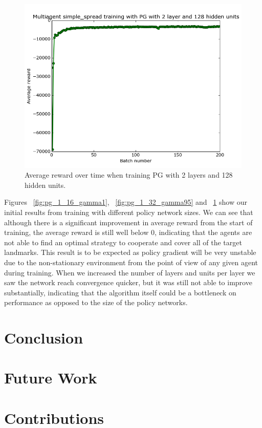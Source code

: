 \documentclass{article}
\begin{document}
\begin{figure}
\centering
    \includegraphics[scale=0.25]{pg_2_128_gamma1}
    \caption{Average reward over time when training PG with 2 layers and 128 hidden units.}
\label{fig:pg_2_128_gamma1}
\end{figure}

Figures ~\ref{fig:pg_1_16_gamma1}, ~\ref{fig:pg_1_32_gamma95}  and ~\ref{fig:pg_2_128_gamma1} show our initial results from training with different policy network sizes. We can see that although there is a significant improvement in average reward from the start of training, the average reward is still well below 0, indicating that the agents are not able to find an optimal strategy to cooperate and cover all of the target landmarks. This result is to be expected as policy gradient will be very unstable due to the non-stationary environment from the point of view of any given agent during training. When we increased the number of layers and units per layer we saw the network reach convergence quicker, but it was still not able to improve substantially, indicating that the algorithm itself could be a bottleneck on performance as opposed to the size of the policy networks.

\section{Conclusion}

\section{Future Work}

\section*{Contributions}




\end{document}
